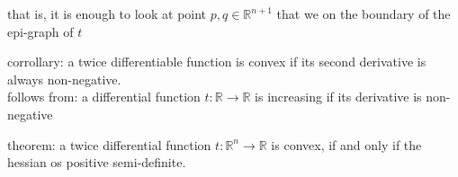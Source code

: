 that is, it is enough to look at point $p,q \in \mathbb{R}^{n+1}$ that we on the boundary of the epi-graph of $t$


\begin{framed}
corrollary: a twice differentiable function is convex if its second derivative is always non-negative.\\
follows from: a differential function $t: \mathbb{R} \rightarrow \mathbb{R}$ is increasing if its derivative is non-negative
\end{framed}

\begin{framed}
theorem: a twice differential function $t: \mathbb{R}^n \rightarrow \mathbb{R}$ is convex, if and only if the hessian os positive semi-definite.

\end{framed}

